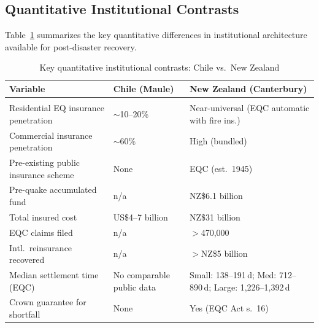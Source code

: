\subsection{Quantitative Institutional Contrasts}

Table~\ref{tab:quantcontrasts} summarizes the key quantitative differences in institutional architecture available for post-disaster recovery.

\begin{table}[!htbp]
\centering
\caption{Key quantitative institutional contrasts: Chile vs.\ New Zealand}
\label{tab:quantcontrasts}
\footnotesize
\begin{tabular}{@{}
  >{\raggedright\arraybackslash}p{}
  >{\raggedright\arraybackslash}p{}
  >{\raggedright\arraybackslash}p{}
@{}}
\toprule
\textbf{Variable} &
\textbf{Chile (Maule)} &
\textbf{New Zealand (Canterbury)} \\
\midrule

\multicolumn{3}{@{}l}{\textit{\textbf{A. Insurance architecture}}} \\
\addlinespace[2pt]

Residential EQ insurance penetration &
${\sim}$10--20\% &
Near-universal (EQC automatic with fire ins.) \\

Commercial insurance penetration &
${\sim}$60\% &
High (bundled) \\

Pre-existing public insurance scheme &
None &
EQC (est.\ 1945) \\

Pre-quake accumulated fund &
n/a &
NZ\$6.1 billion \parencite{eqc2017annual} \\

Total insured cost &
US\$4--7 billion &
NZ\$31 billion \parencite{ICNZ2024} \\

EQC claims filed &
n/a &
$>$470,000 \\

Intl.\ reinsurance recovered &
n/a &
$>$NZ\$5 billion \parencite{NHC2024} \\

Median settlement time (EQC) &
No comparable public data &
Small: 138--191\,d; Med: 712--890\,d; Large: 1,226--1,392\,d \parencite{Khakurel2021} \\

Crown guarantee for shortfall &
None &
Yes (EQC Act s.\ 16) \\


\end{tabular}
\end{table}
